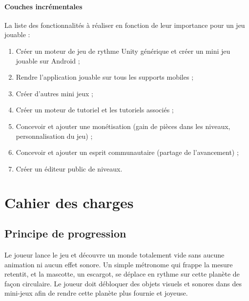 \paragraph{Couches incrémentales}
La liste des fonctionnalités à réaliser en fonction de leur importance pour un jeu jouable :
\begin{enumerate}
\item Créer un moteur de jeu de rythme Unity générique et créer un mini jeu jouable sur Android ;
\item Rendre l’application jouable sur tous les supports mobiles ;
\item Créer d’autres mini jeux ;
\item Créer un moteur de tutoriel et les tutoriels associés ;
\item Concevoir et ajouter une monétisation (gain de pièces dans les niveaux, personnalisation du jeu) ;
\item Concevoir et ajouter un esprit communautaire (partage de l’avancement) ;
\item Créer un éditeur public de niveaux.
\end{enumerate}


\section{Cahier des charges}

\subsection{Principe de progression}
\paragraph{} Le joueur lance le jeu et découvre un monde totalement vide sans aucune animation ni aucun effet sonore. Un simple métronome qui frappe la mesure retentit, et la mascotte, un escargot, se déplace en rythme sur cette planète de façon circulaire.
Le joueur doit débloquer des objets visuels et sonores dans des mini-jeux afin de rendre cette planète plus fournie et joyeuse.

